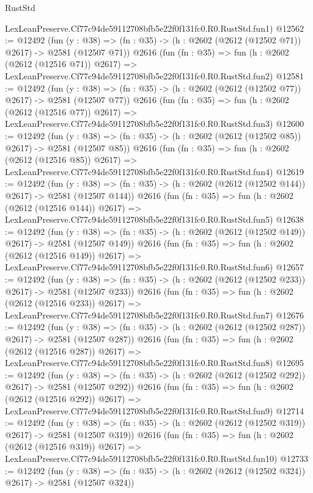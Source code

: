 \begin{lexlean}{RustStd}
\begin{coremodule}
    LexLeanPreserve.Cf77c94de59112708bfb5e22f0f131fc0.R0.RustStd.fun1)
@12562 := @12492
    (fun (y : @38) => (fn : @35) -> (h : @2602 (@2612 (@12502 @71)) @2617) -> @2581 (@12507 @71))
    @2616
    (fun (fn : @35) =>
    fun (h : @2602 (@2612 (@12516 @71)) @2617) =>
    LexLeanPreserve.Cf77c94de59112708bfb5e22f0f131fc0.R0.RustStd.fun2)
@12581 := @12492
    (fun (y : @38) => (fn : @35) -> (h : @2602 (@2612 (@12502 @77)) @2617) -> @2581 (@12507 @77))
    @2616
    (fun (fn : @35) =>
    fun (h : @2602 (@2612 (@12516 @77)) @2617) =>
    LexLeanPreserve.Cf77c94de59112708bfb5e22f0f131fc0.R0.RustStd.fun3)
@12600 := @12492
    (fun (y : @38) => (fn : @35) -> (h : @2602 (@2612 (@12502 @85)) @2617) -> @2581 (@12507 @85))
    @2616
    (fun (fn : @35) =>
    fun (h : @2602 (@2612 (@12516 @85)) @2617) =>
    LexLeanPreserve.Cf77c94de59112708bfb5e22f0f131fc0.R0.RustStd.fun4)
@12619 := @12492
    (fun (y : @38) => (fn : @35) -> (h : @2602 (@2612 (@12502 @144)) @2617) -> @2581 (@12507 @144))
    @2616
    (fun (fn : @35) =>
    fun (h : @2602 (@2612 (@12516 @144)) @2617) =>
    LexLeanPreserve.Cf77c94de59112708bfb5e22f0f131fc0.R0.RustStd.fun5)
@12638 := @12492
    (fun (y : @38) => (fn : @35) -> (h : @2602 (@2612 (@12502 @149)) @2617) -> @2581 (@12507 @149))
    @2616
    (fun (fn : @35) =>
    fun (h : @2602 (@2612 (@12516 @149)) @2617) =>
    LexLeanPreserve.Cf77c94de59112708bfb5e22f0f131fc0.R0.RustStd.fun6)
@12657 := @12492
    (fun (y : @38) => (fn : @35) -> (h : @2602 (@2612 (@12502 @233)) @2617) -> @2581 (@12507 @233))
    @2616
    (fun (fn : @35) =>
    fun (h : @2602 (@2612 (@12516 @233)) @2617) =>
    LexLeanPreserve.Cf77c94de59112708bfb5e22f0f131fc0.R0.RustStd.fun7)
@12676 := @12492
    (fun (y : @38) => (fn : @35) -> (h : @2602 (@2612 (@12502 @287)) @2617) -> @2581 (@12507 @287))
    @2616
    (fun (fn : @35) =>
    fun (h : @2602 (@2612 (@12516 @287)) @2617) =>
    LexLeanPreserve.Cf77c94de59112708bfb5e22f0f131fc0.R0.RustStd.fun8)
@12695 := @12492
    (fun (y : @38) => (fn : @35) -> (h : @2602 (@2612 (@12502 @292)) @2617) -> @2581 (@12507 @292))
    @2616
    (fun (fn : @35) =>
    fun (h : @2602 (@2612 (@12516 @292)) @2617) =>
    LexLeanPreserve.Cf77c94de59112708bfb5e22f0f131fc0.R0.RustStd.fun9)
@12714 := @12492
    (fun (y : @38) => (fn : @35) -> (h : @2602 (@2612 (@12502 @319)) @2617) -> @2581 (@12507 @319))
    @2616
    (fun (fn : @35) =>
    fun (h : @2602 (@2612 (@12516 @319)) @2617) =>
    LexLeanPreserve.Cf77c94de59112708bfb5e22f0f131fc0.R0.RustStd.fun10)
@12733 := @12492
    (fun (y : @38) => (fn : @35) -> (h : @2602 (@2612 (@12502 @324)) @2617) -> @2581 (@12507 @324))

\end{coremodule}
\end{lexlean}

